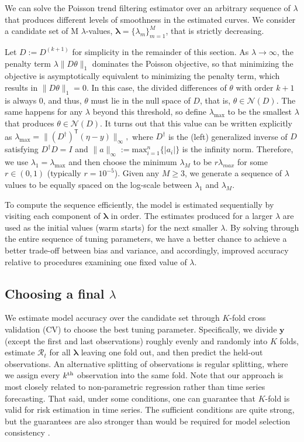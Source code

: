 \documentclass[10pt,letterpaper]{article}
\newcommand{\lr}[1]{\left(#1\right)}
\newcommand{\snorm}[1]{\lVert #1 \rVert}
\def\bfy{\mathbf{y}}
\def\calR{\mathcal{R}}
\renewcommand{\top}{\mathsf{T}}
\def\th{^{\textnormal{th}}}
\begin{document}
We can solve the Poisson trend filtering estimator over an arbitrary sequence of 
$\lambda$ that produces different levels of smoothness in the estimated curves. 
We consider a candidate set of M $\lambda$-values, $\boldsymbol{\lambda} = \{\lambda_m\}_{m=1}^M$,
that is strictly decreasing.


Let $D := D^{(k+1)}$ for simplicity in the remainder of this section. As
$\lambda \to\infty$, the penalty term $\lambda \snorm{D\theta}_1$ dominates the
Poisson objective, so that minimizing the objective is asymptotically equivalent
to minimizing the penalty term, which results in $\snorm{D\theta}_1 = 0$. In
this case, the divided differences of $\theta$ with order $k+1$ is always $0$,
and thus, $\theta$ must lie in the null space of $D$, that is,
$\theta\in\mathcal{N}(D)$. The same happens for any $\lambda$ beyond this
threshold, so define $\lambda_{\textrm{max}}$ to be the smallest $\lambda$ that
produces $\theta\in\mathcal{N}(D)$. It turns out that this value can be written
explicitly as $\lambda_{\textrm{max}} = \snorm{\lr{D^{\dagger}}^{\top} \lr{\eta
- y}}_{\infty},$ where $D^{\dagger}$ is the (left) generalized inverse of $D$
satisfying $D^{\dagger} D = I$ and $\snorm{a}_{\infty} := \mathrm{max}_{i=1}^n\{|a_i|\}$ is the infinity norm. 
Therefore, we use $\lambda_1 =
\lambda_{\textrm{max}}$ and then choose the minimum $\lambda_M$ to be
$r\lambda_{max}$ for some $r \in (0,1)$ (typically $r=10^{-5}$). Given any
$M\geq 3$, we generate a sequence of $\lambda$ values to be equally spaced on
the log-scale between $\lambda_1$ and $\lambda_M$. 

To compute the sequence efficiently, the model is estimated sequentially by
visiting each component of $\boldsymbol{\lambda}$ in order. The estimates
produced for a larger $\lambda$ are used as the initial values (warm starts) for
the next smaller $\lambda$. By solving through the entire sequence of tuning
parameters, we have a better chance to achieve a better trade-off between bias
and variance, and accordingly, improved accuracy relative to procedures
examining one fixed value of $\lambda$.


\subsection{Choosing a final $\lambda$}
\label{sec:cv}

We estimate model accuracy over the candidate set through $K$-fold cross
validation (CV) to choose the best tuning parameter. Specifically, we divide
$\bfy$ (except the first and last observations) roughly evenly and randomly into
$K$ folds, estimate $\calR_t$ for all $\boldsymbol{\lambda}$ leaving one fold
out, and then predict the held-out observations. 
An alternative splitting of observations is regular splitting, where we assign every
$k\th$ observation into the same fold. Note that our approach is most closely
related to non-parametric regression rather than time series forecasting. That
said, under some conditions, one can guarantee that $K$-fold is valid for risk
estimation in time series. The sufficient conditions are quite strong, but the
guarantees are also stronger than would be required for model selection
consistency \cite{BERGMEIR201870}. 
\end{document}
